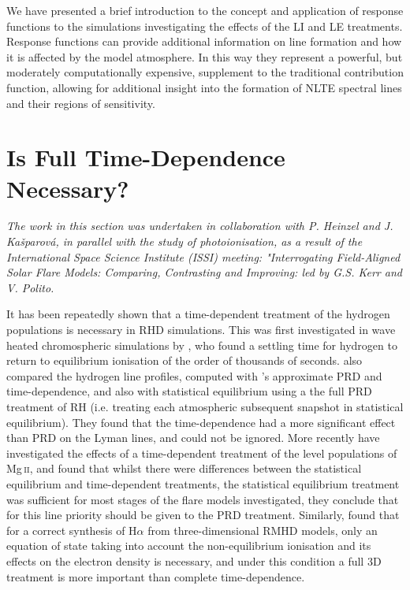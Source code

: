 We have presented a brief introduction to the concept and application of response functions to the simulations investigating the effects of the LI and LE treatments.
Response functions can provide additional information on line formation and how it is affected by the model atmosphere.
In this way they represent a powerful, but moderately computationally expensive, supplement to the traditional contribution function, allowing for additional insight into the formation of NLTE spectral lines and their regions of sensitivity.

\section{Is Full Time-Dependence Necessary?}\label{Sec:TimeDepSE}

\emph{The work in this section was undertaken in collaboration with P. Heinzel and J. Kašparová, in parallel with the study of \Caii{} photoionisation, as a result of the International Space Science Institute (ISSI) meeting: "Interrogating Field-Aligned Solar Flare Models: Comparing, Contrasting and Improving: led by G.S. Kerr and V. Polito.}

It has been repeatedly shown that a time-dependent treatment of the hydrogen populations is necessary in RHD simulations.
This was first investigated in wave heated chromospheric simulations by \citet{Carlsson2002}, who found a settling time for hydrogen to return to equilibrium ionisation of the order of thousands of seconds.
\citet{Brown2018} also compared the hydrogen line profiles, computed with \Radyn{}'s approximate PRD and time-dependence, and also with statistical equilibrium using a the full PRD treatment of RH (i.e. treating each atmospheric subsequent snapshot in statistical equilibrium).
They found that the time-dependence had a more significant effect than PRD on the Lyman lines, and could not be ignored.
More recently \citet{Kerr2019a} have investigated the effects of a time-dependent treatment of the level populations of Mg\,\textsc{ii}, and found that whilst there were differences between the statistical equilibrium and time-dependent treatments, the statistical equilibrium treatment was sufficient for most stages of the flare models investigated, they conclude that for this line priority should be given to the PRD treatment.
Similarly, \citet{Leenaarts2012a} found that for a correct synthesis of H$\alpha$ from three-dimensional RMHD models, only an equation of state taking into account the non-equilibrium ionisation and its effects on the electron density is necessary, and under this condition a full 3D treatment is more important than complete time-dependence.


